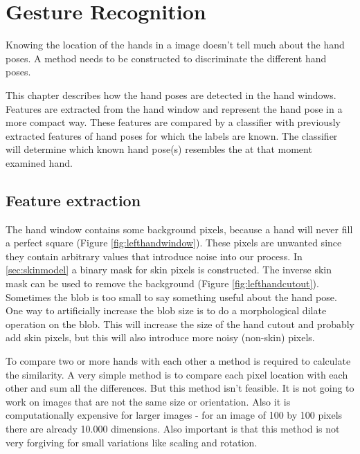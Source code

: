 
\chapter{Gesture Recognition}
\label{ch:gestures}

Knowing the location of the hands in a image doesn't tell much about the hand poses. A method needs to be constructed to discriminate the different hand poses.

This chapter describes how the hand poses are detected in the hand windows. Features are extracted from the hand window and represent the hand pose in a more compact way. These features are compared by a classifier with previously extracted features of hand poses for which the labels are known. The classifier will determine which known hand pose(s) resembles the at that moment examined hand.


\section{Feature extraction}
The hand window contains some background pixels, because a hand will never fill a perfect square (Figure \autoref{fig:lefthandwindow}). These pixels are unwanted since they contain arbitrary values that introduce noise into our process. In \autoref{sec:skinmodel} a binary mask for skin pixels is constructed. The inverse skin mask can be used  to remove the background (Figure \autoref{fig:lefthandcutout}). Sometimes the blob is too small to say something useful about the hand pose. One way to artificially increase the blob size is to do a morphological dilate operation on the blob. This will increase the size of the hand cutout and probably add skin pixels, but this will also introduce more noisy (non-skin) pixels.

To compare two or more hands with each other a method is required to calculate the similarity. A very simple method is to compare each pixel location with each other and sum all the differences. But this method isn't feasible. It is not going to work on images that are not the same size or orientation. Also it is computationally expensive for larger images - for an image of 100 by 100 pixels there are already 10.000 dimensions. Also important is that this method is not very forgiving for small variations like scaling and rotation.


